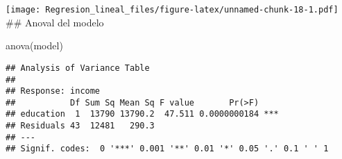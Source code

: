 \documentclass[
]{article}
\newenvironment{Shaded}{\begin{snugshade}}{\end{snugshade}}
\newcommand{\FunctionTok}[1]{\textcolor[rgb]{0.00,0.00,0.00}{#1}}
\newcommand{\NormalTok}[1]{#1}
\begin{document}
\texttt{[image: Regresion\_lineal\_files/figure-latex/unnamed-chunk-18-1.pdf]}
\#\# Anoval del modelo

\begin{Shaded}
\begin{Highlighting}[]
\FunctionTok{anova}\NormalTok{(model)}
\end{Highlighting}
\end{Shaded}

\begin{verbatim}
## Analysis of Variance Table
## 
## Response: income
##           Df Sum Sq Mean Sq F value       Pr(>F)    
## education  1  13790 13790.2  47.511 0.0000000184 ***
## Residuals 43  12481   290.3                         
## ---
## Signif. codes:  0 '***' 0.001 '**' 0.01 '*' 0.05 '.' 0.1 ' ' 1
\end{verbatim}
\end{document}
